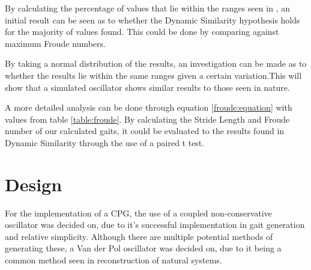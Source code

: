  By calculating the percentage of values that lie within the ranges seen in \cite{Alexander1983}, an initial result can be seen as to whether the Dynamic Similarity hypothesis holds for the majority of values found. This could be done by comparing against maximum Froude numbers. 

By taking a normal distribution of the results, an investigation can be made as to whether the results lie within the same ranges given a certain variation.This will show that a simulated oscillator shows similar results to those seen in nature. 

A more detailed analysis can be done through equation \ref{froude:equation} with values from table \ref{table:froude}. By calculating the Stride Length and Froude number of our calculated gaits, it could be evaluated to the results found in Dynamic Similarity through the use of a paired t test. 







\section{Design}

For the implementation of a CPG, the use of a coupled non-conservative oscillator was decided on, due to it's successful implementation in gait generation and relative simplicity. Although there are multiple potential methods of generating these, a Van der Pol oscillator was decided on, due to it being a common method seen in reconstruction of natural systems. 


